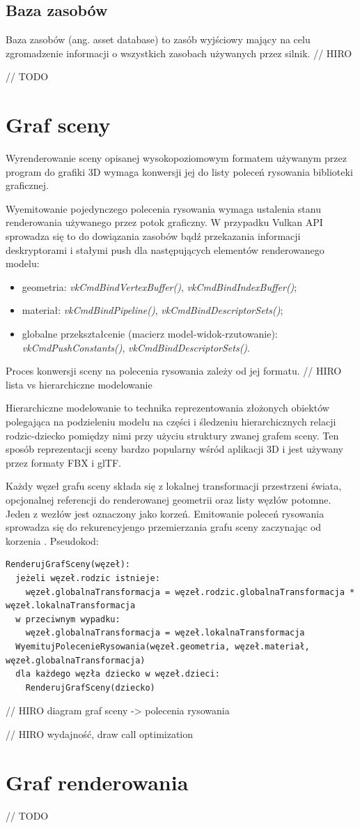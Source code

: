 \subsection{Baza zasobów}
Baza zasobów (ang. asset database) to zasób wyjściowy mający na celu zgromadzenie informacji o wszystkich zasobach używanych przez silnik.
// HIRO



// TODO

\section{Graf sceny}

Wyrenderowanie sceny opisanej wysokopoziomowym formatem używanym przez program do grafiki 3D wymaga konwersji jej do listy poleceń rysowania biblioteki graficznej.

Wyemitowanie pojedynczego polecenia rysowania wymaga ustalenia stanu renderowania używanego przez potok graficzny. W przypadku Vulkan API sprowadza się to do dowiązania zasobów bądź przekazania informacji deskryptorami i stałymi push dla następujących elementów renderowanego modelu:
\begin{itemize}
	\item geometria: \textit{vkCmdBindVertexBuffer()}, \textit{vkCmdBindIndexBuffer()};
	\item materiał: \textit{vkCmdBindPipeline()}, \textit{vkCmdBindDescriptorSets()};
	\item globalne przekształcenie (macierz model-widok-rzutowanie): \textit{vkCmdPushConstants()}, \textit{vkCmdBindDescriptorSets()}.
\end{itemize}

Proces konwersji sceny na polecenia rysowania zależy od jej formatu.
// HIRO lista vs hierarchiczne modelowanie

Hierarchiczne modelowanie to technika reprezentowania złożonych obiektów polegająca na podzieleniu modelu na części i śledzeniu hierarchicznych relacji rodzic-dziecko pomiędzy nimi przy użyciu struktury zwanej grafem sceny. Ten sposób reprezentacji sceny bardzo popularny wśród aplikacji 3D i jest używany przez formaty FBX i glTF.

Każdy węzeł grafu sceny składa się z lokalnej transformacji przestrzeni świata, opcjonalnej referencji do renderowanej geometrii oraz listy węzłów potomne. Jeden z wezłów jest oznaczony jako korzeń.
Emitowanie poleceń rysowania sprowadza się do rekurencyjengo przemierzania grafu sceny zaczynając od korzenia \cite{kosarevsky20213d}.
Pseudokod:
\lstset{language=verbatim}
\begin{lstlisting}[caption={Emitowanie poleceń rysowania na podstawie grafu sceny},captionpos=b]
RenderujGrafSceny(węzeł):
  jeżeli węzeł.rodzic istnieje:
    węzeł.globalnaTransformacja = węzeł.rodzic.globalnaTransformacja * węzeł.lokalnaTransformacja
  w przeciwnym wypadku:
    węzeł.globalnaTransformacja = węzeł.lokalnaTransformacja
  WyemitujPolecenieRysowania(węzeł.geometria, węzeł.materiał, węzeł.globalnaTransformacja)
  dla każdego węzła dziecko w węzeł.dzieci:
    RenderujGrafSceny(dziecko)
\end{lstlisting}

// HIRO diagram graf sceny -> polecenia rysowania

// HIRO wydajność, draw call optimization

\section{Graf renderowania}

// TODO